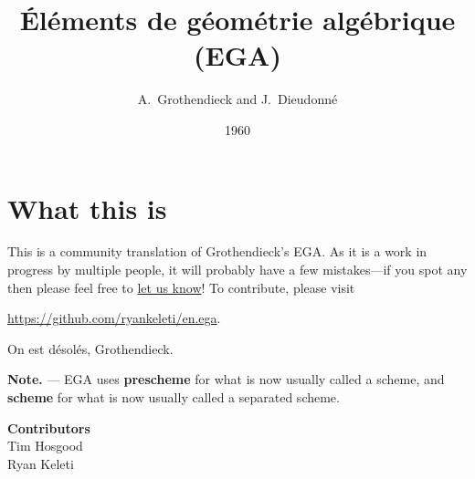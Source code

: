 \documentclass[10pt,oneside]{book}
\begin{document}
\title{\'El\'ements de g\'eom\'etrie alg\'ebrique\\
(EGA)}
\author{A.~Grothendieck and J.~Dieudonn\'e}
\date{1960}
\maketitle
\frontmatter
\chapter*{What this is}
    This is a community translation of Grothendieck's EGA.
    As it is a work in progress by multiple people, it will probably have a few
    mistakes---if you spot any then please feel free to
    \href{https://github.com/ryankeleti/en.ega/issues}{let us know}! To contribute,
    please visit
    \begin{center}
      \url{https://github.com/ryankeleti/en.ega}.
    \end{center}
    On est d\'esol\'es, Grothendieck.

\noindent
    \textbf{Note.} --- EGA uses \textbf{prescheme} for what is now usually called
    a scheme, and \textbf{scheme} for what is now usually called a
    separated scheme.
    \begin{center}
      \textbf{Contributors}\\
      Tim Hosgood\\
      Ryan Keleti
    \end{center}
{
  \tableofcontents{}
}
\clearpage
\mainmatter



\clearpage



\clearpage

    

\clearpage


\end{document}
